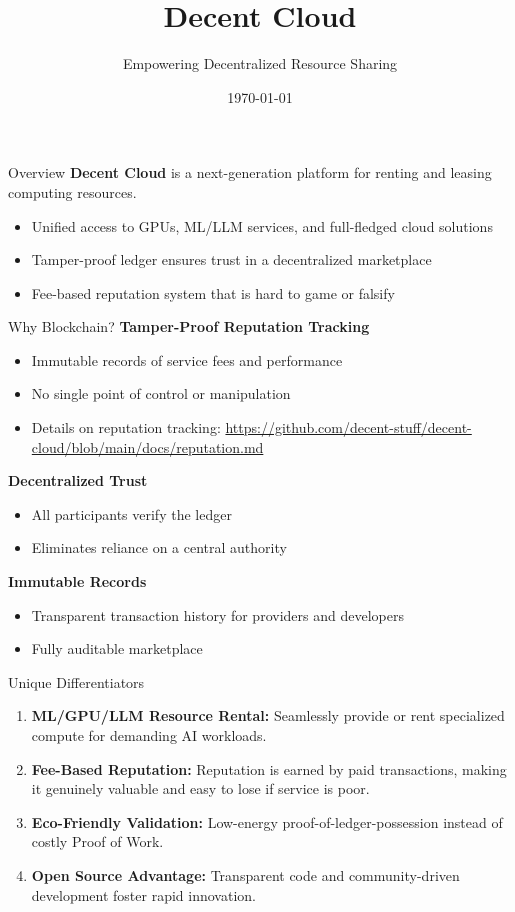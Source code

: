 \documentclass{beamer}
\title{Decent Cloud}
\subtitle{Empowering Decentralized Resource Sharing}
\date{\today}
\begin{document}
{
\begin{frame}[plain]
  \titlepage
\end{frame}
}

\begin{frame}{Overview}
\textbf{Decent Cloud} is a next-generation platform for renting and leasing computing resources.
\begin{itemize}
  \item Unified access to GPUs, ML/LLM services, and full-fledged cloud solutions
  \item Tamper-proof ledger ensures trust in a decentralized marketplace
  \item Fee-based reputation system that is hard to game or falsify
\end{itemize}
\end{frame}

\begin{frame}{Why Blockchain?}
\textbf{Tamper-Proof Reputation Tracking}
\begin{itemize}
  \item Immutable records of service fees and performance
  \item No single point of control or manipulation
  \item Details on reputation tracking: \url{https://github.com/decent-stuff/decent-cloud/blob/main/docs/reputation.md}
\end{itemize}

\textbf{Decentralized Trust}
\begin{itemize}
  \item All participants verify the ledger
  \item Eliminates reliance on a central authority
\end{itemize}

\textbf{Immutable Records}
\begin{itemize}
  \item Transparent transaction history for providers and developers
  \item Fully auditable marketplace
\end{itemize}
\end{frame}

\begin{frame}{Unique Differentiators}
\begin{enumerate}
  \item \textbf{ML/GPU/LLM Resource Rental:} Seamlessly provide or rent specialized compute for demanding AI workloads.
  \item \textbf{Fee-Based Reputation:} Reputation is earned by paid transactions, making it genuinely valuable and easy to lose if service is poor.
  \item \textbf{Eco-Friendly Validation:} Low-energy proof-of-ledger-possession instead of costly Proof of Work.
  \item \textbf{Open Source Advantage:} Transparent code and community-driven development foster rapid innovation.
\end{enumerate}
\end{frame}
\end{document}
